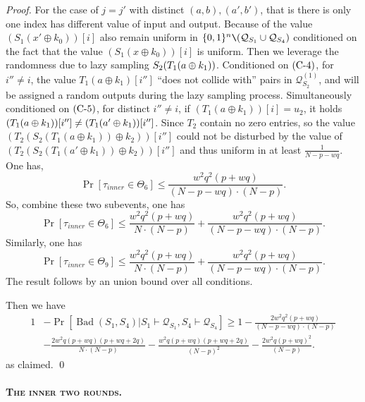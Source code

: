 \begin{proof}
For the case of $j=j'$ with distinct $(a,b),(a',b')$, that is there is only one index has different value of input and output. Because of the value $\left(S_{1}\left(x' \oplus k_{0}\right)\right)[i]$ also remain uniform in $\{0, 1\}^{n} \verb|\| (\mathcal{Q}_{S_{1}} \cup \mathcal{Q}_{S_{4}})$ conditioned on the fact that the value $\left(S_{1}\left(x \oplus k_{0}\right)\right)[i]$ is uniform. Then we leverage the randomness due to lazy sampling $S_2(T_1(a\oplus k_1))$. Conditioned on $\text{(C-4)}$, for $i''\neq i$, the value $T_1(a \oplus k_1)[i'']$ ``does not collide with'' pairs in $\mathcal{Q}_{S_{2}}^{(1)}$, and will be assigned a random outputs during the lazy sampling process. Simultaneously conditioned on $\text{(C-5)}$, for distinct $i'' \neq i$, if $(T_1\left(a \oplus k_{1}\right))[i] = u_2$, it holds $(T_1(a\oplus k_1))[i'']\neq(T_1(a'\oplus k_1))[i'']$. Since $T_2$ contain no zero entries, so the value $\left(T_{2}\left(S_{2}\left(T_1\left(a \oplus k_{1}\right)\right) \oplus k_{2}\right)\right)[i'']$ could not be disturbed by the value of $\left(T_{2}\left(S_{2}\left(T_1\left(a' \oplus k_{1}\right)\right) \oplus k_{2}\right)\right)[i'']$ and thus uniform in at least
$\frac{1}{N - p- wq}$. One has,
$$
\operatorname{Pr}\left[\tau_{inner} \in \Theta_{6}\right] \leq \frac{w^{2} q^{2} (p+w q)}{(N- p- wq) \cdot (N-p)}.
$$
So, combine these two subevents, one has
$$
\operatorname{Pr}\left[\tau_{inner} \in \Theta_{6}\right] \leq \frac{w^{2} q^{2} (p+w q)}{N \cdot (N-p)} + \frac{w^{2} q^{2} (p+w q)}{(N- p- wq) \cdot (N- p)}.
$$
%
Similarly, one has
%
$$
\operatorname{Pr}\left[\tau_{inner} \in \Theta_{9}\right] \leq \frac{w^{2} q^{2} (p+w q)}{N \cdot (N-p)} + \frac{w^{2} q^{2} (p+w q)}{(N- p- wq) \cdot (N-p)}.
$$
The result follows by an union bound over all conditions.


Then we have
$$
\begin{aligned}
1&-\operatorname{Pr}\left[\operatorname{Bad}\left(S_{1},S_{4}\right) | S_{1} \vdash \mathcal{Q}_{S_{1}},S_{4} \vdash \mathcal{Q}_{S_{4}}\right] \geq 1 - \frac{2 w^{2} q^{2} (p+w q)}{(N- p- wq) \cdot (N-p)}\\
& -\frac{2 w^{2} q (p+w q)(p+w q+2 q)}{N \cdot (N-p)} - \frac{w^{2} q (p+w q)(p+w q+2 q)}{(N-p)^2} - \frac{2 w^{2} q (p+w q)^{2}}{(N-p)}.
\end{aligned}
$$
as claimed.       \qed
\end{proof}




\paragraph{\textsc{The inner two rounds.}}


